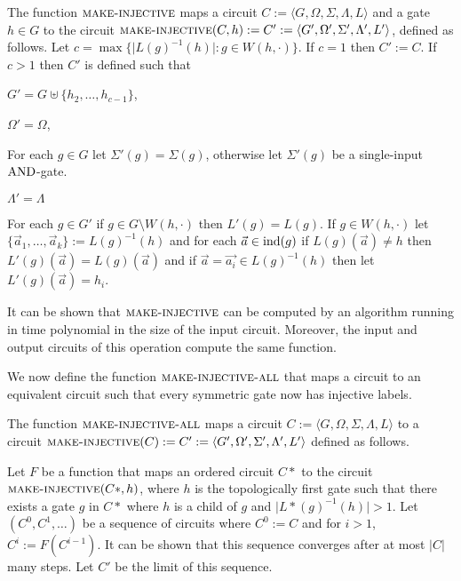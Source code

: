 \documentclass[../paper.tex]{subfiles}
\begin{document}
\begin{definition}
  \label{def:make-injective}
  The function ${\normalfont\textsc{make-injective}}$ maps a circuit $C := \langle G, \Omega,
  \Sigma , \Lambda, L \rangle$ and a gate $h \in G$ to the circuit
  ${\normalfont\textsc{make-injective}}(C, h) := C' := \langle G', \Omega', \Sigma', \Lambda', L'
  \rangle$, defined as follows. Let $c = \max \{\vert L(g)^{-1}(h)\vert : g \in
  W(h, \cdot)\}$. If $c = 1$ then $C' := C$. If $c > 1$ then $C'$ is defined
  such that
  \begin{itemizens}
  \item $G' = G \uplus \{h_2, \ldots, h_{c-1}\}$,
  \item $\Omega' = \Omega$,
  \item For each $g \in G$ let $\Sigma' (g) = \Sigma(g)$, otherwise let
    $\Sigma'(g)$ be a single-input $\text{\upshape AND}$-gate.
  \item $\Lambda'= \Lambda$
  \item For each $g \in G'$ if $g \in G \setminus W(h, \cdot)$ then $L'(g) =
    L(g)$. If $g \in W(h, \cdot)$ let $\{\vec{a}_1, \ldots, \vec{a}_k\} :=
    L(g)^{-1}(h)$ and for each $\vec{a} \in \text{\upshape ind}(g)$ if $L(g)(\vec{a}) \neq h$
    then $L'(g)(\vec{a}) = L(g)(\vec{a})$ and if $\vec{a} = \vec{a_i} \in
    L(g)^{-1}(h)$ then let $L'(g)(\vec{a}) = h_i$.
  \end{itemizens}
\end{definition}

It can be shown that ${\normalfont\textsc{make-injective}}$ can be computed by an algorithm
running in time polynomial in the size of the input circuit. Moreover, the input
and output circuits of this operation compute the same function.

We now define the function ${\normalfont\textsc{make-injective-all}}$ that maps a circuit to an
equivalent circuit such that every symmetric gate now has injective labels.

\begin{definition}
  The function ${\normalfont\textsc{make-injective-all}}$ maps a circuit $C := \langle G, \Omega,
  \Sigma , \Lambda, L \rangle$ to a circuit ${\normalfont\textsc{make-injective}}(C) := C' :=
  \langle G', \Omega', \Sigma', \Lambda', L' \rangle$ defined as follows.

  Let $F$ be a function that maps an ordered circuit $C*$ to the circuit
  ${\normalfont\textsc{make-injective}}(C*, h)$, where $h$ is the topologically first gate such
  that there exists a gate $g$ in $C*$ where $h$ is a child of $g$ and $\vert
  L*(g)^{-1}(h) \vert > 1$. Let $(C^0, C^1, \ldots)$ be a sequence of circuits
  where $C^0 := C$ and for $i > 1$, $C^i := F(C^{i-1})$. It can be shown that
  this sequence converges after at most $\vert C \vert$ many steps. Let $C'$ be
  the limit of this sequence.
\end{definition}
\end{document}
